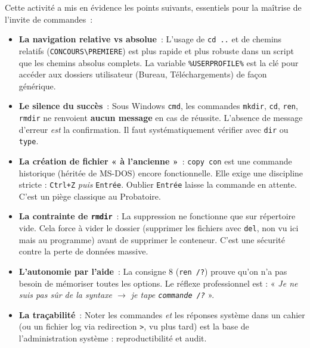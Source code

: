 \documentclass[11pt]{article}
\newcounter{popsec}
\newcounter{popsub}
\newcommand{\courssub}[1]{%
  \stepcounter{popsub}%
  \par\vspace{9pt}\noindent{\popxbold\fontsize{11.5}{13}\selectfont\color{popink}{\color{poporange}\thepopsec.\thepopsub}\hspace{6pt}#1}\par\nopagebreak\vspace{4pt}
}
\begin{document}
\courssub{Bilan de l'activité}
\noindent
Cette activité a mis en évidence les points suivants, essentiels pour la maîtrise de l'invite de commandes~:

\begin{itemize}
    \item \textbf{La navigation relative vs absolue}~: L'usage de \texttt{cd ..} et de chemins relatifs (\texttt{CONCOURS\textbackslash PREMIERE}) est plus rapide et plus robuste dans un script que les chemins absolus complets. La variable \texttt{\%USERPROFILE\%} est la clé pour accéder aux dossiers utilisateur (Bureau, Téléchargements) de façon générique.
    \item \textbf{Le silence du succès}~: Sous Windows \texttt{cmd}, les commandes \texttt{mkdir}, \texttt{cd}, \texttt{ren}, \texttt{rmdir} ne renvoient \textbf{aucun message} en cas de réussite. L'absence de message d'erreur \emph{est} la confirmation. Il faut systématiquement vérifier avec \texttt{dir} ou \texttt{type}.
    \item \textbf{La création de fichier « à l'ancienne »}~: \texttt{copy con} est une commande historique (héritée de MS-DOS) encore fonctionnelle. Elle exige une discipline stricte : \texttt{Ctrl+Z} \emph{puis} \texttt{Entrée}. Oublier \texttt{Entrée} laisse la commande en attente. C'est un piège classique au Probatoire.
    \item \textbf{La contrainte de \texttt{rmdir}}~: La suppression ne fonctionne que sur répertoire vide. Cela force à vider le dossier (supprimer les fichiers avec \texttt{del}, non vu ici mais au programme) avant de supprimer le conteneur. C'est une sécurité contre la perte de données massive.
    \item \textbf{L'autonomie par l'aide}~: La consigne 8 (\texttt{ren /?}) prouve qu'on n'a pas besoin de mémoriser toutes les options. Le réflexe professionnel est : « \emph{Je ne suis pas sûr de la syntaxe $\to$ je tape \texttt{commande /?}} ».
    \item \textbf{La traçabilité}~: Noter les commandes \emph{et} les réponses système dans un cahier (ou un fichier log via redirection \texttt{>}, vu plus tard) est la base de l'administration système : reproductibilité et audit.
\end{itemize}
\end{document}
